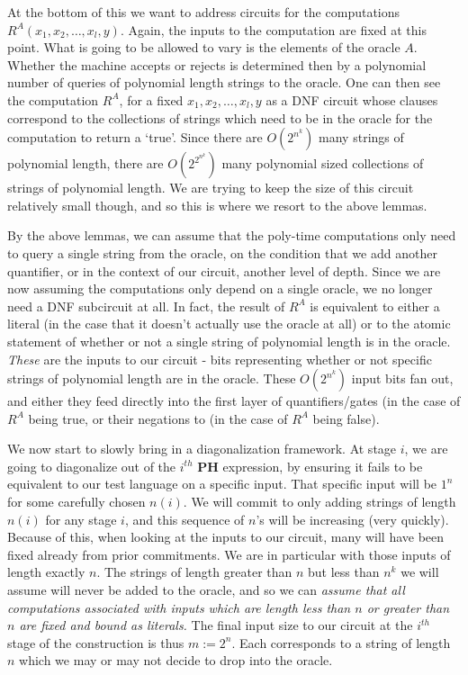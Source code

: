At the bottom of this we want to address circuits for the computations $R^A(x_1,x_2,\ldots,x_l,y)$. Again, the inputs to the computation are fixed at this point. What is going to be allowed to vary is the elements of the oracle $A$. Whether the machine accepts or rejects is determined then by a polynomial number of queries of polynomial length strings to the oracle. One can then see the computation $R^A$, for a fixed $x_1,x_2,\ldots,x_l,y$ as a DNF circuit whose clauses correspond to the collections of strings which need to be in the oracle for the computation to return a `true'. Since there are $O(2^{n^k})$ many strings of polynomial length, there are $O(2^{2^{n^k}})$ many polynomial sized collections of strings of polynomial length. We are trying to keep the size of this circuit relatively small though, and so this is where we resort to the above lemmas. \par 
By the above lemmas, we can assume that the poly-time computations only need to query a single string from the oracle, on the condition that we add another quantifier, or in the context of our circuit, another level of depth. Since we are now assuming the computations only depend on a single oracle, we no longer need a DNF subcircuit at all. In fact, the result of $R^A$ is equivalent to either a literal (in the case that it doesn't actually use the oracle at all) or to the atomic statement of whether or not a single string of polynomial length is in the oracle. \emph{These} are the inputs to our circuit - bits representing whether or not specific strings of polynomial length are in the oracle. These $O(2^{n^k})$ input bits fan out, and either they feed directly into the first layer of quantifiers/gates (in the case of $R^A$ being true, or their negations to (in the case of $R^A$ being false). \par 
We now start to slowly bring in a diagonalization framework. At stage $i$, we are going to diagonalize out of the $i^{th}$ $\bm{PH}$ expression, by ensuring it fails to be equivalent to our test language on a specific input. That specific input will be $1^n$ for some carefully chosen $n(i)$. We will commit to only adding strings of length $n(i)$ for any stage $i$, and this sequence of $n$'s will be increasing (very quickly). Because of this, when looking at the inputs to our circuit, many will have been fixed already from prior commitments. We are in particular with those inputs of length exactly $n$. The strings of length greater than $n$ but less than $n^k$ we will assume will never be added to the oracle, and so we can \emph{assume that all computations associated with inputs which are length less than $n$ or greater than $n$ are fixed and bound as literals.} The final input size to our circuit at the $i^{th}$ stage of the construction is thus $m := 2^n$. Each corresponds to a string of length $n$ which we may or may not decide to drop into the oracle. \par 
